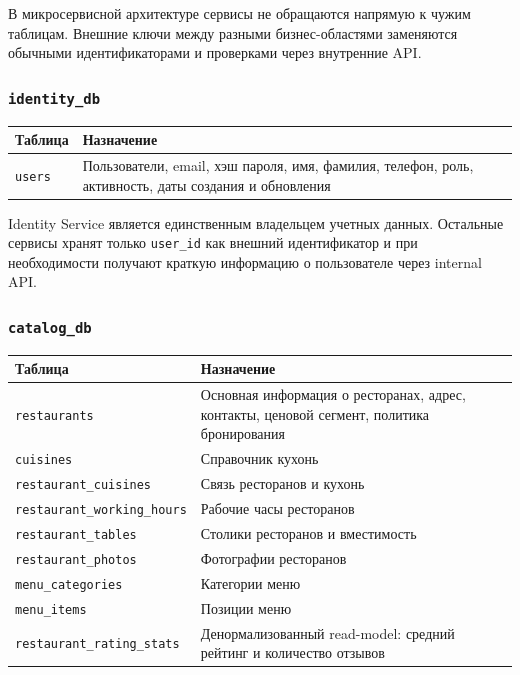 \documentclass[14pt,a4paper]{extarticle}
\newcommand{\code}[1]{\texttt{#1}}
\begin{document}
В микросервисной архитектуре сервисы не обращаются напрямую к чужим таблицам. Внешние ключи между разными бизнес-областями заменяются обычными идентификаторами и проверками через внутренние API.

\subsubsection{\code{identity\_db}}

\begin{longtable}{|L{0.28\textwidth}|L{0.62\textwidth}|}
\hline
\textbf{Таблица} & \textbf{Назначение} \\
\hline
\code{users} & Пользователи, email, хэш пароля, имя, фамилия, телефон, роль, активность, даты создания и обновления \\
\hline
\end{longtable}

Identity Service является единственным владельцем учетных данных. Остальные сервисы хранят только \code{user\_id} как внешний идентификатор и при необходимости получают краткую информацию о пользователе через internal API.

\subsubsection{\code{catalog\_db}}

\begin{longtable}{|L{0.32\textwidth}|L{0.58\textwidth}|}
\hline
\textbf{Таблица} & \textbf{Назначение} \\
\hline
\code{restaurants} & Основная информация о ресторанах, адрес, контакты, ценовой сегмент, политика бронирования \\
\hline
\code{cuisines} & Справочник кухонь \\
\hline
\code{restaurant\_cuisines} & Связь ресторанов и кухонь \\
\hline
\code{restaurant\_working\_hours} & Рабочие часы ресторанов \\
\hline
\code{restaurant\_tables} & Столики ресторанов и вместимость \\
\hline
\code{restaurant\_photos} & Фотографии ресторанов \\
\hline
\code{menu\_categories} & Категории меню \\
\hline
\code{menu\_items} & Позиции меню \\
\hline
\code{restaurant\_rating\_stats} & Денормализованный read-model: средний рейтинг и количество отзывов \\
\hline
\end{longtable}
\end{document}

